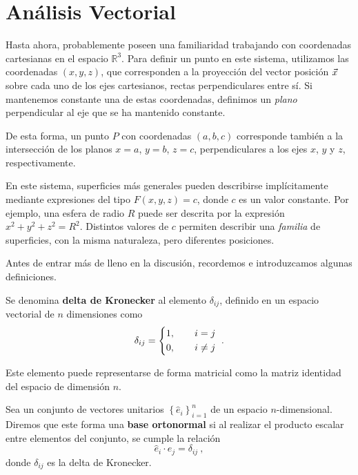 \chapter{Análisis Vectorial}

Hasta ahora, probablemente poseen una familiaridad trabajando con coordenadas cartesianas en el espacio $\mathbb{R}^3$. Para definir un punto en este sistema, utilizamos las coordenadas $(x,y,z)$, que corresponden a la proyección del vector posición $\vec{x}$ sobre cada uno de los ejes cartesianos, rectas perpendiculares entre sí. Si mantenemos constante una de estas coordenadas, definimos un \emph{plano} perpendicular al eje que se ha mantenido constante. 

De esta forma, un punto $P$ con coordenadas $(a,b,c)$ corresponde también a la intersección de los planos $x=a$, $y=b$, $z=c$, perpendiculares a los ejes $x$, $y$ y $z$, respectivamente.

En este sistema, superficies más generales pueden describirse implícitamente mediante expresiones del tipo $F(x,y,z) = c$, donde $c$ es un valor constante. Por ejemplo, una esfera de radio $R$ puede ser descrita por la expresión $x^2+y^2+z^2 = R^2$. Distintos valores de $c$ permiten describir una \emph{familia} de superficies, con la misma naturaleza, pero diferentes posiciones.

Antes de entrar más de lleno en la discusión, recordemos e introduzcamos algunas definiciones.

\begin{defi} 
    Se denomina \textbf{delta de Kronecker} al elemento $\delta_{ij}$, definido en un espacio vectorial de $n$ dimensiones como
    \begin{equation}
        \delta_{ij} = \begin{dcases}
            1, \qquad i = j \\
            0, \qquad i \neq j
        \end{dcases} \ .
    \end{equation} 

    Este elemento puede representarse de forma matricial como la matriz identidad del espacio de dimensión $n$.
\end{defi}

\newpage

\begin{defi} 
    Sea un conjunto de vectores unitarios $\left\{ \hat{e}_i\right\}_{i=1}^n$ de un espacio $n$-dimensional. Diremos que este forma una \textbf{base ortonormal} si al realizar el producto escalar entre elementos del conjunto, se cumple la relación
    \begin{equation}
        \hat{e}_i\cdot \hat{e}_j = \delta_{ij} \ ,
    \end{equation}
    donde $\delta_{ij}$ es la delta de Kronecker.
\end{defi}

